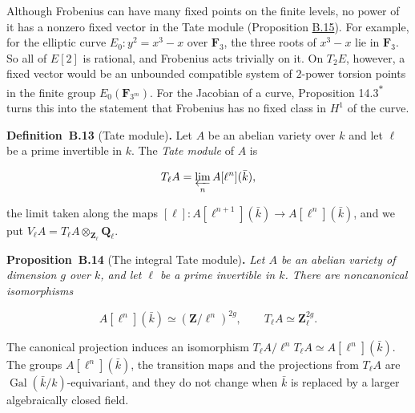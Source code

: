 \documentclass[11pt]{article}
\newenvironment{bpstatement}[2]{\par\addvspace{0.6\baselineskip}\noindent\textbf{#1}#2\textbf{.}\enspace\ignorespaces}
  {\par\addvspace{0.4\baselineskip}}
\newenvironment{bpstatementit}[2]{\begin{bpstatement}{#1}{#2}\itshape\ignorespaces}{\end{bpstatement}}
\newcommand{\bpout}[1]{#1\textsuperscript{\hyperlink{bp-outside}{\ensuremath{\ast}}}}
\begin{document}
Although Frobenius can have many fixed points on the finite levels, no power of it has a nonzero fixed vector in the Tate module (Proposition \hyperref[bp43]{B.15}). For example, for the elliptic curve \(E_0:y^2=x^3-x\) over \(\mathbf F_3\), the three roots of \(x^3-x\) lie in \(\mathbf F_3\). So all of \(E[2]\) is rational, and Frobenius acts trivially on it. On \(T_2E\), however, a fixed vector would be an unbounded compatible system of \(2\)-power torsion points in the finite group \(E_0(\mathbf F_{3^m})\). For the Jacobian of a curve, Proposition \bpout{14.3} turns this into the statement that Frobenius has no fixed class in \(H^1\) of the curve.

\label{bp39}%
\begin{bpstatement}{Definition~B.13}{ (Tate module)}
Let \(A\) be an abelian variety over \(k\) and let \(\ell\) be a prime invertible in \(k\). The \emph{Tate module} of \(A\) is

\[
T_\ell A=\varprojlim_n A[\ell^n](\bar k),
\]

the limit taken along the maps \([\ell]:A[\ell^{n+1}](\bar k)\to
A[\ell^n](\bar k)\), and we put \(V_\ell A=T_\ell A\otimes_{\mathbf Z_\ell}\mathbf Q_\ell\).
\end{bpstatement}

\label{bp40}%
\begin{bpstatementit}{Proposition~B.14}{ (The integral Tate module)}
Let \(A\) be an abelian variety of dimension \(g\) over \(k\), and let \(\ell\) be a prime invertible in \(k\). There are noncanonical isomorphisms

\[
A[\ell^n](\bar k)\simeq(\mathbf Z/\ell^n)^{2g},\qquad
T_\ell A\simeq\mathbf Z_\ell^{2g}.
\]

The canonical projection induces an isomorphism \(T_\ell A/\ell^nT_\ell A\simeq A[\ell^n](\bar k)\). The groups \(A[\ell^n](\bar k)\), the transition maps and the projections from \(T_\ell A\) are \(\operatorname{Gal}(\bar k/k)\)-equivariant, and they do not change when \(\bar k\) is replaced by a larger algebraically closed field.
\end{bpstatementit}
\end{document}
